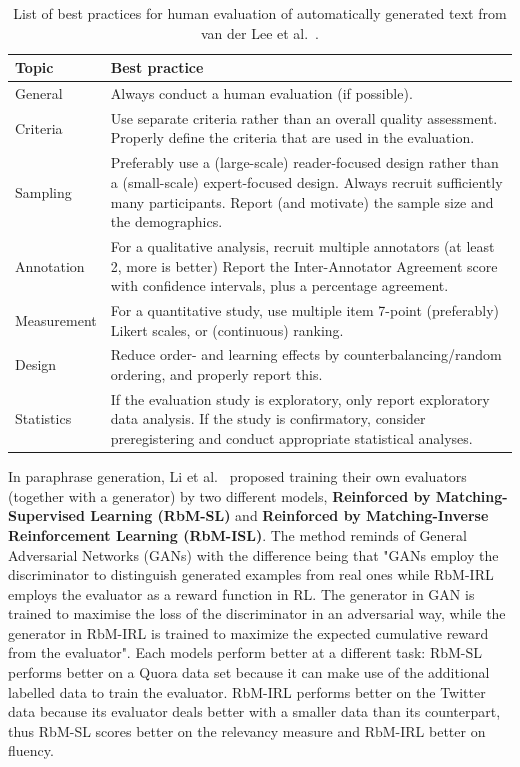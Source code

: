 \documentclass[11pt]{article}
\begin{document}
\begin{table}[h!]
\begin{center}
\begin{tabular}{m{7em}m{12cm}}
 \textbf{Topic} & \textbf{Best practice}  \\ \hline
 General & Always conduct a human evaluation (if possible).  \\  \hline
 Criteria & Use separate criteria rather than an overall quality assessment.
Properly define the criteria that are used in the evaluation. \\\hline
Sampling & Preferably use a (large-scale) reader-focused design rather than a (small-scale) expert-focused design.
Always recruit sufficiently many participants. Report (and motivate) the sample size and the demographics. \\\hline
Annotation &  For a qualitative analysis, recruit multiple annotators (at least 2, more is better)
Report the Inter-Annotator Agreement score with confidence intervals, plus a percentage agreement. \\\hline
Measurement & For a quantitative study, use multiple item 7-point (preferably) Likert scales, or (continuous) ranking. \\\hline
Design &  Reduce order- and learning effects by counterbalancing/random ordering, and properly report this. \\\hline
Statistics & If the evaluation study is exploratory, only report exploratory data analysis.
If the study is confirmatory, consider preregistering and conduct appropriate statistical analyses.
\end{tabular}
\caption{List of best practices for human evaluation of automatically generated text from van der Lee et al.~.}
\label{table:1}
\end{center}
\end{table}

In paraphrase generation, Li et al.~ proposed training their own evaluators (together with a generator) by two different models, \textbf{Reinforced by Matching-Supervised Learning (RbM-SL)} and \textbf{Reinforced by Matching-Inverse Reinforcement Learning (RbM-ISL)}. The method reminds of General Adversarial Networks (GANs) with the difference being that "GANs employ the discriminator to distinguish generated examples from real ones while RbM-IRL employs the evaluator as a reward function in RL. The generator in GAN is trained to maximise the loss of the discriminator in an adversarial way, while the generator in RbM-IRL is trained to maximize the expected cumulative reward from the evaluator". Each models perform better at a different task: RbM-SL performs better on a Quora data set because it can make use of the additional labelled data to train the evaluator. RbM-IRL performs better on the Twitter data because its evaluator deals better with a smaller data than its counterpart, thus RbM-SL scores better on the relevancy measure and RbM-IRL better on fluency.
\end{document}
